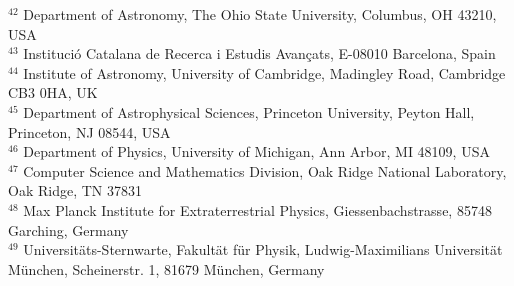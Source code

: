 {{$^{42}$ Department of Astronomy, The Ohio State University, Columbus, OH 43210, USA\\
$^{43}$ Instituci\'o Catalana de Recerca i Estudis Avan\c{c}ats, E-08010 Barcelona, Spain\\
$^{44}$ Institute of Astronomy, University of Cambridge, Madingley Road, Cambridge CB3 0HA, UK\\
$^{45}$ Department of Astrophysical Sciences, Princeton University, Peyton Hall, Princeton, NJ 08544, USA\\
$^{46}$ Department of Physics, University of Michigan, Ann Arbor, MI 48109, USA\\
$^{47}$ Computer Science and Mathematics Division, Oak Ridge National Laboratory, Oak Ridge, TN 37831\\
$^{48}$ Max Planck Institute for Extraterrestrial Physics, Giessenbachstrasse, 85748 Garching, Germany\\
$^{49}$ Universit\"ats-Sternwarte, Fakult\"at f\"ur Physik, Ludwig-Maximilians Universit\"at M\"unchen, Scheinerstr. 1, 81679 M\"unchen, Germany\\
}
}
